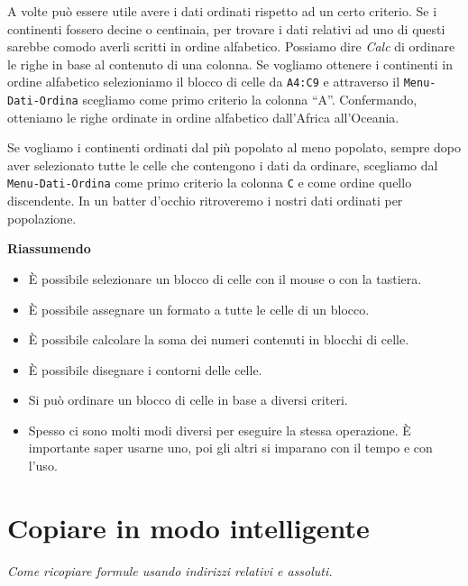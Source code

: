 A volte può essere utile avere i dati ordinati rispetto ad un certo criterio.
Se i continenti fossero decine o centinaia, per trovare i dati relativi ad
uno di questi sarebbe comodo averli scritti in ordine alfabetico.
Possiamo dire \emph{Calc} di ordinare le righe in base
al contenuto di una colonna.
Se vogliamo ottenere i continenti in ordine alfabetico selezioniamo il blocco
di celle da \texttt{A4:C9} e attraverso il \texttt{Menu-Dati-Ordina} scegliamo come
primo criterio la colonna ``A''.
Confermando, otteniamo le righe ordinate in ordine alfabetico dall'Africa
all'Oceania.

Se vogliamo i continenti ordinati dal più popolato al meno popolato, sempre
dopo aver selezionato tutte le celle che contengono i dati da ordinare,
scegliamo dal \texttt{Menu-Dati-Ordina} come primo criterio la colonna \texttt{C} e
come ordine quello discendente.
In un batter d'occhio ritroveremo i nostri dati ordinati per popolazione.

\textbf{Riassumendo}

\begin{itemize}
\item {} 
È possibile selezionare un blocco di celle con il mouse o con la tastiera.

\item {} 
È possibile assegnare un formato a tutte le celle di un blocco.

\item {} 
È possibile calcolare la soma dei numeri contenuti in blocchi di celle.

\item {} 
È possibile disegnare i contorni delle celle.

\item {} 
Si può ordinare un blocco di celle in base a diversi criteri.

\item {} 
Spesso ci sono molti modi diversi per eseguire la stessa operazione.
È importante saper usarne uno, poi gli altri si imparano con il tempo e
con l'uso.

\end{itemize}


\section{Copiare in modo intelligente}
\label{05_01_f_di_calc:copiare-in-modo-intelligente}

\emph{Come ricopiare formule usando indirizzi relativi e assoluti.}

